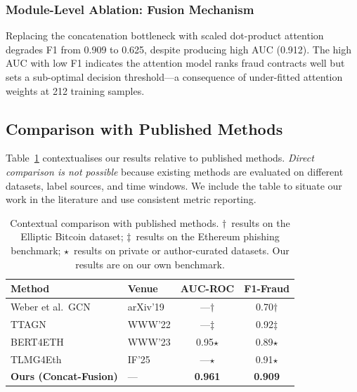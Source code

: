 \subsubsection{Module-Level Ablation: Fusion Mechanism}

Replacing the concatenation bottleneck with scaled dot-product attention
degrades F1 from 0.909 to 0.625, despite producing high AUC (0.912).
The high AUC with low F1 indicates the attention model ranks fraud
contracts well but sets a sub-optimal decision threshold---a consequence
of under-fitted attention weights at 212 training samples.

\subsection{Comparison with Published Methods}
\label{subsec:sota}

Table~\ref{tab:sota} contextualises our results relative to published
methods.  \emph{Direct comparison is not possible} because existing
methods are evaluated on different datasets, label sources, and time
windows.  We include the table to situate our work in the literature and
use consistent metric reporting.

\begin{table}[t]
\centering
\caption{Contextual comparison with published methods. $\dagger$~results
on the Elliptic Bitcoin dataset; $\ddagger$~results on the Ethereum
phishing benchmark; $\star$~results on private or author-curated
datasets. Our results are on our own benchmark.}
\label{tab:sota}
\begin{tabular}{llcc}
\toprule
Method & Venue & AUC-ROC & F1-Fraud \\
\midrule
Weber et al.\ GCN~\cite{weber2019} & arXiv'19 & ---$\dagger$ & 0.70$\dagger$ \\
TTAGN~\cite{li2022ttagn}           & WWW'22   & ---$\ddagger$ & 0.92$\ddagger$ \\
BERT4ETH~\cite{hu2023bert4eth}     & WWW'23   & 0.95$\star$ & 0.89$\star$ \\
TLMG4Eth~\cite{sun2025tlmg4eth}    & IF'25    & ---$\star$  & 0.91$\star$ \\
\midrule
\textbf{Ours (Concat-Fusion)}      & ---      & \textbf{0.961} & \textbf{0.909} \\
\bottomrule
\end{tabular}
\end{table}

